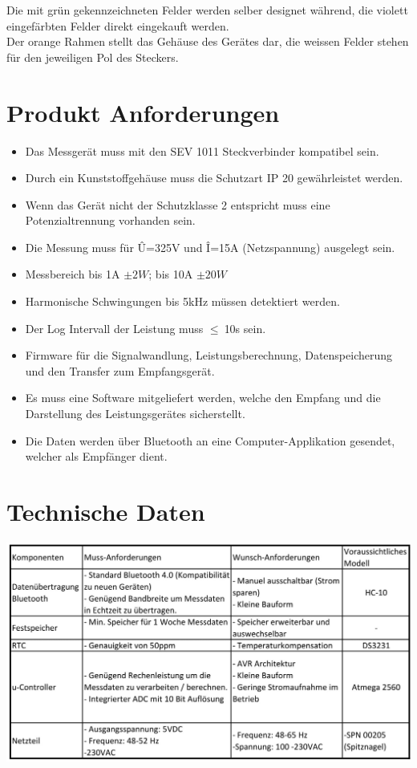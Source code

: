 \documentclass[12pt,a4paper]{article}
\begin{document}
Die mit grün gekennzeichneten Felder werden selber designet während, die violett eingefärbten Felder direkt eingekauft werden.\\
Der orange Rahmen stellt das Gehäuse des Gerätes dar, die weissen Felder stehen für den jeweiligen Pol des Steckers.

\newpage
\section{Produkt Anforderungen}
\begin{itemize}
\item Das Messgerät muss mit den SEV 1011 Steckverbinder kompatibel sein.
\item Durch ein Kunststoffgehäuse muss die Schutzart IP 20 gewährleistet werden.
\item Wenn das Gerät nicht der Schutzklasse 2 entspricht muss eine Potenzialtrennung vorhanden sein.
\item Die Messung muss für Û=325V und Î=15A (Netzspannung) ausgelegt sein.
\item Messbereich bis 1A $\pm2W$; bis 10A $\pm 20W$
\item Harmonische Schwingungen bis 5kHz müssen detektiert werden.
\item Der Log Intervall der Leistung muss $\leq \ $10s sein.

\item Firmware für die Signalwandlung, Leistungsberechnung, Datenspeicherung und den Transfer zum Empfangsgerät.
\item Es muss eine Software mitgeliefert werden, welche den Empfang und die Darstellung des Leistungsgerätes sicherstellt. 

\item Die Daten werden über Bluetooth an eine Computer-Applikation gesendet, welcher als Empfänger dient. 
\end{itemize}


\section{Technische Daten}

 \includegraphics[scale=0.45]{Komp-1.png}
\end{document}
